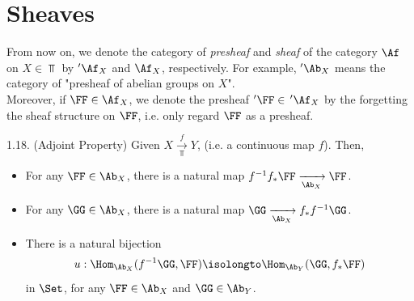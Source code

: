 \chapter{Sheaves}
\begin{notation}{}
    From now on, we denote the category of \textit{presheaf} and \textit{sheaf} of the category $\Af$ on $X\in\Top$ by $'\Af_X$ and $\Af_X$, respectively. For example, $'\Ab_X$ means the category of "presheaf of abelian groups on $X$".\\
    Moreover, if $\FF\in\Af_X$, we denote the presheaf $'\FF\in\,'\Af_X$ by the forgetting the sheaf structure on $\FF$, i.e. only regard $\FF$ as a presheaf.
\end{notation}

\begin{exe}{1.18. (Adjoint Property)}
    Given $X\xrightarrow[\Top]{f}Y$, (i.e. a continuous map $f$). Then,
    \begin{itemize}
        \item[(i)] For any $\FF\in\Ab_X$, there is a natural map $f^{-1}f_\ast\FF\xrightarrow[\Ab_X]{}\FF$.
        \item[(ii)] For any $\GG\in\Ab_X$, there is a natural map $\GG\xrightarrow[\Ab_X]{}f_\ast f^{-1}\GG$.
        \item[(iii)] There is a natural bijection
        \begin{align*}
            u:\Hom_{\Ab_X}(f^{-1}\GG,\FF)\isolongto\Hom_{\Ab_Y}(\GG,f_\ast\FF)
        \end{align*}
        in $\Set$, for any $\FF\in\Ab_X$ and $\GG\in\Ab_Y$.
    \end{itemize}
\end{exe}
